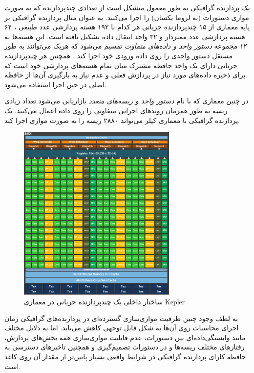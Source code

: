 \documentclass{thesis}
\begin{document}
یک پردازنده گرافیکی به طور معمول متشکل است از تعدادی چند‌پردازنده
که به صورت موازی دستورات (نه لزوما یکسان) را اجرا می‌کنند. به عنوان مثال
پردازنده گرافیکی
بر پایه معماری
از ۱۵ چند‌پردازنده‌ جریانی
هر کدام با 
۱۹۲
هسته پردازشی عدد طبیعی
، ۶۴ هسته پردازشی عدد ممیزدار
 و ۳۲ واحد انتقال داده
تشکیل یافته است.
این هسته‌ها به ۱۲ مجموعه 
\textit{دستور واحد و داده‌های متفاوت}
تقسیم می‌شود که هریک می‌توانند به طور مستقل دستور
واحدی‌ را روی داده ورودی خود اجرا کند
.
همچنین هر
چند‌پردازنده‌ جریانی
دارای یک واحد حافظه مشترک
میان تمام هسته‌های پردازشی خود است که برای ذخیره داده‌های مورد نیاز در پردازش
فعلی و عدم نیاز به بارگیری
آن‌ها از حافظه اصلی  در حین اجرا استفاده می‌شود.

در چنین معماری که با نام
\textit{دستور واحد و ریسه‌های متعدد}
بازاریابی می‌شود تعداد زیادی
ریسه
به طور همزمان روند‌های اجرایی متفاوتی را روی داده اعمال می‌کنند.
یک پردازنده گرافیکی با معماری کپلر می‌تواند
۲۸۸۰
ریسه را به صورت موازی اجرا کند.

\begin{figure}[h]
\centering
\includegraphics[width=0.7\textwidth]{./pics/2}
\caption{%
ساختار داخلی یک چندپردازنده جریانی در معماری
Kepler
}
\end{figure}

به لطف وجود چنین ظرفیت موازی‌سازی گسترده‌ای در پردازنده‌های گرافیکی زمان اجرای
محاسبات روی آن‌ها به شکل قابل توجهی کاهش می‌یابد. اما به دلایل مختلف 
مانند وابستگی‌داده‌ای بین دستورات، عدم قابلیت موازی‌سازی همه بخش‌های
پردازش، رفتار‌های مختلف
 ریسه‌ها و در دستورات تصمیم‌گیری
و همچنین تاخیر‌های دسترسی به حافظه کارای پردازنده گرافیکی در شرایط واقعی بسیار
پایین‌تر از مقدار آن روی کاغذ است.
\end{document}
